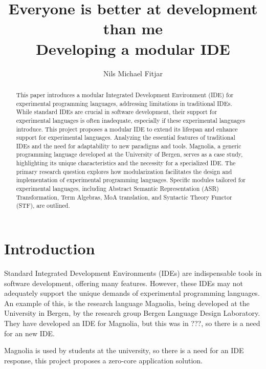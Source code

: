 \documentclass[runningheads]{llncs}
\title{Everyone is better at development than me\\
\large{Developing a modular IDE}
}
\author{Nils Michael Fitjar\inst{1}
}
\institute{University of Bergen
\email{nfi005@uib.no}
}
\begin{document}
\maketitle

\begin{abstract}
  This paper introduces a modular Integrated Development Environment (IDE) for
  experimental programming languages, addressing limitations in traditional
  IDEs. While standard IDEs are crucial in software development, their support
  for experimental languages is often inadequate, especially if these
  experimental languages introduce. This project proposes a modular IDE to
  extend its lifespan and enhance support for experimental languages. Analyzing
  the essential features of traditional IDEs and the need for adaptability to
  new paradigms and tools. Magnolia, a generic programming language developed at
  the University of Bergen, serves as a case study, highlighting its unique
  characteristics and the necessity for a specialized IDE.
  The primary research question explores how
  modularization facilitates the design and implementation of experimental
  programming languages. Specific modules tailored for experimental languages,
  including Abstract Semantic Representation (ASR) Transformation,
  Term Algebras, MoA translation, and Syntactic Theory Functor (STF), are
  outlined.
\end{abstract}

\section{Introduction}

Standard Integrated Development Environments (IDEs) are indispensable tools in
software development, offering many features. However, these IDEs may not
adequately support the unique demands of experimental programming languages. An
example of this, is the research language Magnolia, being developed at the University
in Bergen, by the research group Bergen Language Design Laboratory. They have
developed an IDE for Magnolia, but this was in ???, so there is a need for an
new IDE.

Magnolia is
used by students at the university, so there is a need for an IDE
response, this project proposes a zero-core application solution.
\end{document}
